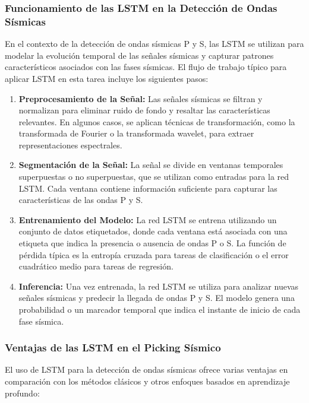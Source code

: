 \subsubsection{Funcionamiento de las LSTM en la Detección de Ondas Sísmicas}

En el contexto de la detección de ondas sísmicas P y S, las LSTM se utilizan para modelar la evolución temporal de las señales sísmicas y capturar patrones característicos asociados con las fases sísmicas. El flujo de trabajo típico para aplicar LSTM en esta tarea incluye los siguientes pasos:

\begin{enumerate}
    \item \textbf{Preprocesamiento de la Señal:} Las señales sísmicas se filtran y normalizan para eliminar ruido de fondo y resaltar las características relevantes. En algunos casos, se aplican técnicas de transformación, como la transformada de Fourier o la transformada wavelet, para extraer representaciones espectrales.

    \item \textbf{Segmentación de la Señal:} La señal se divide en ventanas temporales superpuestas o no superpuestas, que se utilizan como entradas para la red LSTM. Cada ventana contiene información suficiente para capturar las características de las ondas P y S.

    \item \textbf{Entrenamiento del Modelo:} La red LSTM se entrena utilizando un conjunto de datos etiquetados, donde cada ventana está asociada con una etiqueta que indica la presencia o ausencia de ondas P o S. La función de pérdida típica es la entropía cruzada para tareas de clasificación o el error cuadrático medio para tareas de regresión.

    \item \textbf{Inferencia:} Una vez entrenada, la red LSTM se utiliza para analizar nuevas señales sísmicas y predecir la llegada de ondas P y S. El modelo genera una probabilidad o un marcador temporal que indica el instante de inicio de cada fase sísmica.
\end{enumerate}

\subsubsection{Ventajas de las LSTM en el Picking Sísmico}

El uso de LSTM para la detección de ondas sísmicas ofrece varias ventajas en comparación con los métodos clásicos y otros enfoques basados en aprendizaje profundo:


